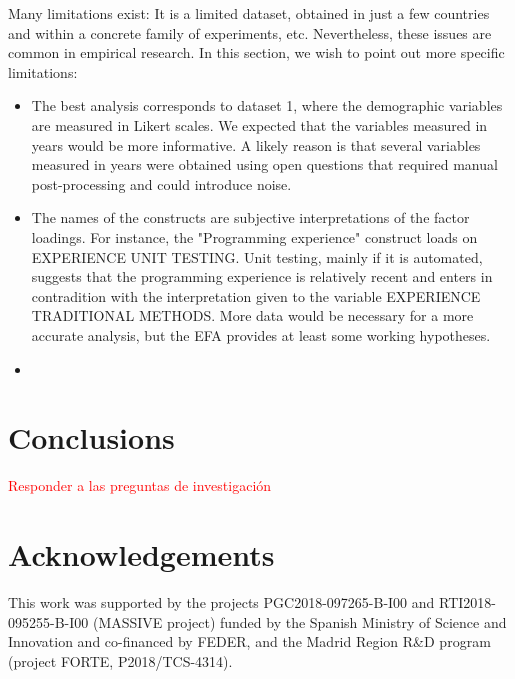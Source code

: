 \documentclass[10pt,conference]{IEEEtran}\usepackage[]{graphicx}\usepackage[table,xcdraw]{xcolor}
\begin{document}
Many limitations exist: It is a limited dataset, obtained in just a few countries and within a concrete family of experiments, etc. Nevertheless, these issues are common in empirical research. In this section, we wish to point out more specific limitations:
\begin{itemize}

    \item The best analysis corresponds to dataset 1, where the demographic variables are measured in Likert scales. We expected that the variables measured in years would be more informative. A likely reason is that several variables measured in years were obtained using open questions that required manual post-processing and could introduce noise.

    \item The names of the constructs are subjective interpretations of the factor loadings. For instance, the "Programming experience" construct loads on EXPERIENCE UNIT TESTING. Unit testing, mainly if it is automated, suggests that the programming experience is relatively recent and enters in contradition with the interpretation given to the variable EXPERIENCE TRADITIONAL METHODS. More data would be necessary for a more accurate analysis, but the EFA provides at least some working hypotheses.
    
    \item 
    
\end{itemize}



\section{Conclusions}

\textcolor{red}{Responder a las preguntas de investigación}

\FloatBarrier

\section{Acknowledgements}

This work was supported by the projects PGC2018-097265-B-I00 and RTI2018-095255-B-I00 (MASSIVE project) funded by the Spanish Ministry of Science and Innovation and co-financed by FEDER, and the Madrid Region R\&D program (project FORTE, P2018/TCS-4314).



\end{document}
